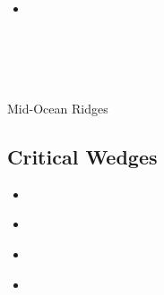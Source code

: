 \begin{scriptsize}
\begin{itemize}
\textcite{luhu21} \\
\textcite{gona21} \\
\textcite{manp21} \\
\textcite{jokd21} \\
\textcite{grrm21} \\
\textcite{deol21} \\
\item[\twothousandtwentytwo] 
\textcite{thhu22} \\
\textcite{olgr22} \\
\textcite{ludn22} \\
\textcite{rutb22} \\
\textcite{thhl22} \\
\end{itemize}
\end{scriptsize}


Mid-Ocean Ridges

\textcite{pukm22} 






\subsection{Critical Wedges}

\begin{scriptsize}
\begin{itemize}
\item[\nineteenninetyfour] 
\textcite{koon94}\\
\item[\twothousandsix] 
\textcite{rosw06}\\
\item[\twothousandeight] 
\textcite{rowf08}\\
\item[\twothousandthirteen] 
\textcite{cass13}\\
\end{itemize}
\end{scriptsize}

